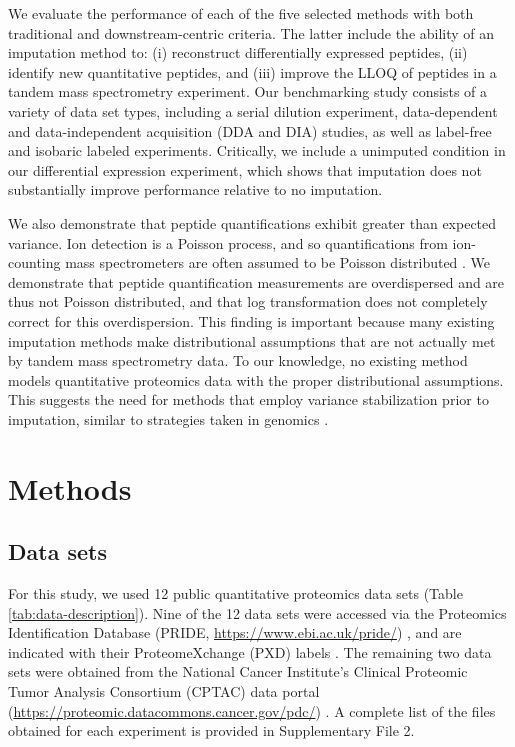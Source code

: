 \documentclass{article}
\begin{document}
We evaluate the performance of each of the five selected methods with both traditional and downstream-centric criteria. The latter include the ability of an imputation method to: (i) reconstruct differentially expressed peptides, (ii) identify new quantitative peptides, and (iii) improve the LLOQ of peptides in a tandem mass spectrometry experiment. Our benchmarking study consists of a variety of data set types, including a serial dilution experiment, data-dependent and data-independent acquisition (DDA and DIA) studies, as well as label-free and isobaric labeled experiments. Critically, we include a unimputed condition in our differential expression experiment, which shows that imputation does not substantially improve performance relative to no imputation. 

We also demonstrate that peptide quantifications exhibit greater than expected variance. Ion detection is a Poisson process, and so quantifications from ion-counting mass spectrometers are often assumed to be Poisson distributed \cite{ms-dist-derivation, stat-theory-lcms}. We demonstrate that peptide quantification measurements are overdispersed and are thus not Poisson distributed, and that log transformation does not completely correct for this overdispersion. This finding is important because many existing imputation methods make distributional assumptions that are not actually met by tandem mass spectrometry data. To our knowledge, no existing method models quantitative proteomics data with the proper distributional assumptions. This suggests the need for methods that employ variance stabilization prior to imputation, similar to strategies taken in genomics \cite{variance-stable, ZINB, neg-binom-scRNAseq}. 

\section{Methods}

\subsection{Data sets}

For this study, we used 12 public quantitative proteomics data sets (Table \ref{tab:data-description}). Nine of the 12 data sets were accessed via the Proteomics Identification Database (PRIDE, \url{https://www.ebi.ac.uk/pride/}) \cite{PRIDE}, and are indicated with their ProteomeXchange (PXD) labels \cite{ProteomeXchange}. The remaining two data sets were obtained from the National Cancer Institute's Clinical Proteomic Tumor Analysis Consortium (CPTAC) data portal (\url{https://proteomic.datacommons.cancer.gov/pdc/}) \cite{CPTAC}. A complete list of the files obtained for each experiment is provided in Supplementary File 2. 
\end{document}
